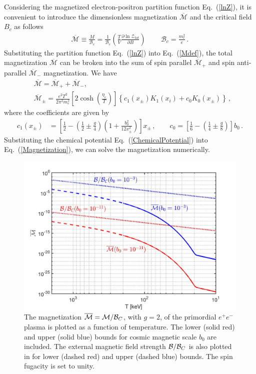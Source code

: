 Considering the magnetized electron-positron partition function Eq.~(\ref{lnZ}), it is convenient to introduce the dimensionless magnetization $\overline{\mathcal{M}}$ and the critical field $B_c$ as follows 
\begin{align}
\label{Mdef}
\overline{\mathcal{M}}\equiv\frac{M}{\mathcal{B}_{c}}=\frac{1}{\mathcal{B}_{c}}\left(\frac{T}{V}\frac{\partial \ln\mathcal{Z}_{tot}}{\partial B}\right)\,\qquad \mathcal{B}_{c}=\frac{m_{e}^{2}}{e}\,.
\end{align}
Substituting the partition function Eq.~(\ref{lnZ}) into Eq.~(\ref{Mdef}), the total magnetization ${\overline{\mathcal M}}$ can be broken into the sum of spin parallel $\overline{\mathcal M}_{+}$ and spin anti-parallel $\overline{\mathcal M}_{-}$ magnetization. We have
\begin{align}\label{Magnetization}
&{\overline{\mathcal M}}={\overline{\mathcal M}_+}+{\overline{\mathcal M}_-},\\
&\overline{\mathcal M}_{\pm}=\frac{e^2T^{2}}{2\pi^2m_e^2}\left[2\cosh\left(\frac{\eta_{e}}{T}\right)\right]\left\{c_{1}(x_{\pm})K_1(x_i)+c_{0}K_0(x_\pm)\right\}\,,
\end{align}
where the coefficients are given by
\begin{align}
    c_{1}(x_{\pm}) &= \left[\frac{1}{2}-\left(\frac{1}{2}\pm\frac{g}{4}\right)\left(1+\frac{b^2_0}{12x^2_\pm}\right)\right]x_\pm\,,\qquad c_{0} = \left[\frac{1}{6}-\left(\frac{1}{4}\pm\frac{g}{8}\right)\right]b_0\,.
\end{align}
Substituting the chemical potential Eq.~(\ref{ChemicalPotential}) into Eq.~(\ref{Magnetization}), we can solve the magnetization numerically.
\begin{figure}[ht]
    \centering
    \includegraphics[width=\textwidth]{./plots/Magnetization_Hc_new002.jpg}
    \caption{The magnetization $\overline{\cal M}=\mathcal{M}/\mathcal{B}_C$, with $g=2$, of the primordial $e^{+}e^{-}$ plasma is plotted as a function of temperature. The lower (solid red) and upper (solid blue) bounds for cosmic magnetic scale $b_{0}$ are included. The external magnetic field strength ${\cal B}/{\cal B}_{C}$ is also plotted in for lower (dashed red) and upper (dashed blue) bounds. The spin fugacity is set to unity.}
    \label{fig:magnet} 
\end{figure}
